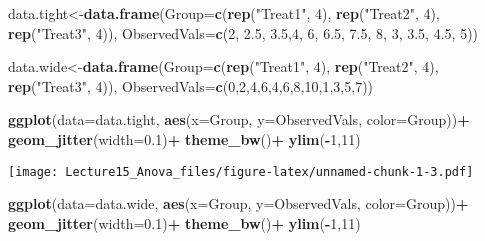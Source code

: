 \documentclass[]{article}
\newenvironment{Shaded}{\begin{snugshade}}{\end{snugshade}}
\newcommand{\KeywordTok}[1]{\textcolor[rgb]{0.13,0.29,0.53}{\textbf{#1}}}
\newcommand{\DataTypeTok}[1]{\textcolor[rgb]{0.13,0.29,0.53}{#1}}
\newcommand{\DecValTok}[1]{\textcolor[rgb]{0.00,0.00,0.81}{#1}}
\newcommand{\FloatTok}[1]{\textcolor[rgb]{0.00,0.00,0.81}{#1}}
\newcommand{\StringTok}[1]{\textcolor[rgb]{0.31,0.60,0.02}{#1}}
\newcommand{\OperatorTok}[1]{\textcolor[rgb]{0.81,0.36,0.00}{\textbf{#1}}}
\newcommand{\NormalTok}[1]{#1}
\begin{document}
\begin{Shaded}
\begin{Highlighting}[]
\NormalTok{data.tight<-}\KeywordTok{data.frame}\NormalTok{(}\DataTypeTok{Group=}\KeywordTok{c}\NormalTok{(}\KeywordTok{rep}\NormalTok{(}\StringTok{"Treat1"}\NormalTok{, }\DecValTok{4}\NormalTok{), }\KeywordTok{rep}\NormalTok{(}\StringTok{"Treat2"}\NormalTok{, }\DecValTok{4}\NormalTok{), }\KeywordTok{rep}\NormalTok{(}\StringTok{"Treat3"}\NormalTok{, }\DecValTok{4}\NormalTok{)), }\DataTypeTok{ObservedVals=}\KeywordTok{c}\NormalTok{(}\DecValTok{2}\NormalTok{, }\FloatTok{2.5}\NormalTok{, }\FloatTok{3.5}\NormalTok{,}\DecValTok{4}\NormalTok{, }\DecValTok{6}\NormalTok{, }\FloatTok{6.5}\NormalTok{, }\FloatTok{7.5}\NormalTok{, }\DecValTok{8}\NormalTok{, }\DecValTok{3}\NormalTok{, }\FloatTok{3.5}\NormalTok{, }\FloatTok{4.5}\NormalTok{, }\DecValTok{5}\NormalTok{))}

\NormalTok{data.wide<-}\KeywordTok{data.frame}\NormalTok{(}\DataTypeTok{Group=}\KeywordTok{c}\NormalTok{(}\KeywordTok{rep}\NormalTok{(}\StringTok{"Treat1"}\NormalTok{, }\DecValTok{4}\NormalTok{), }\KeywordTok{rep}\NormalTok{(}\StringTok{"Treat2"}\NormalTok{, }\DecValTok{4}\NormalTok{), }\KeywordTok{rep}\NormalTok{(}\StringTok{"Treat3"}\NormalTok{, }\DecValTok{4}\NormalTok{)), }\DataTypeTok{ObservedVals=}\KeywordTok{c}\NormalTok{(}\DecValTok{0}\NormalTok{,}\DecValTok{2}\NormalTok{,}\DecValTok{4}\NormalTok{,}\DecValTok{6}\NormalTok{,}\DecValTok{4}\NormalTok{,}\DecValTok{6}\NormalTok{,}\DecValTok{8}\NormalTok{,}\DecValTok{10}\NormalTok{,}\DecValTok{1}\NormalTok{,}\DecValTok{3}\NormalTok{,}\DecValTok{5}\NormalTok{,}\DecValTok{7}\NormalTok{))}

\KeywordTok{ggplot}\NormalTok{(}\DataTypeTok{data=}\NormalTok{data.tight, }\KeywordTok{aes}\NormalTok{(}\DataTypeTok{x=}\NormalTok{Group, }\DataTypeTok{y=}\NormalTok{ObservedVals, }\DataTypeTok{color=}\NormalTok{Group))}\OperatorTok{+}
\StringTok{  }\KeywordTok{geom_jitter}\NormalTok{(}\DataTypeTok{width=}\FloatTok{0.1}\NormalTok{)}\OperatorTok{+}
\StringTok{  }\KeywordTok{theme_bw}\NormalTok{()}\OperatorTok{+}
\StringTok{  }\KeywordTok{ylim}\NormalTok{(}\OperatorTok{-}\DecValTok{1}\NormalTok{,}\DecValTok{11}\NormalTok{)}
\end{Highlighting}
\end{Shaded}

\texttt{[image: Lecture15\_Anova\_files/figure-latex/unnamed-chunk-1-3.pdf]}

\begin{Shaded}
\begin{Highlighting}[]
\KeywordTok{ggplot}\NormalTok{(}\DataTypeTok{data=}\NormalTok{data.wide, }\KeywordTok{aes}\NormalTok{(}\DataTypeTok{x=}\NormalTok{Group, }\DataTypeTok{y=}\NormalTok{ObservedVals, }\DataTypeTok{color=}\NormalTok{Group))}\OperatorTok{+}
\StringTok{  }\KeywordTok{geom_jitter}\NormalTok{(}\DataTypeTok{width=}\FloatTok{0.1}\NormalTok{)}\OperatorTok{+}
\StringTok{  }\KeywordTok{theme_bw}\NormalTok{()}\OperatorTok{+}
\StringTok{  }\KeywordTok{ylim}\NormalTok{(}\OperatorTok{-}\DecValTok{1}\NormalTok{,}\DecValTok{11}\NormalTok{)}
\end{Highlighting}
\end{Shaded}
\end{document}
